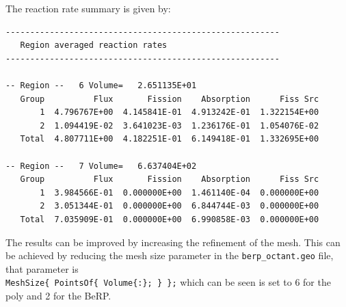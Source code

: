 The reaction rate summary is given by:
\begin{verbatim}
--------------------------------------------------------
   Region averaged reaction rates
--------------------------------------------------------

-- Region --   6 Volume=   2.651135E+01
   Group          Flux       Fission    Absorption      Fiss Src
       1  4.796767E+00  4.145841E-01  4.913242E-01  1.322154E+00
       2  1.094419E-02  3.641023E-03  1.236176E-01  1.054076E-02
   Total  4.807711E+00  4.182251E-01  6.149418E-01  1.332695E+00

-- Region --   7 Volume=   6.637404E+02
   Group          Flux       Fission    Absorption      Fiss Src
       1  3.984566E-01  0.000000E+00  1.461140E-04  0.000000E+00
       2  3.051344E-01  0.000000E+00  6.844744E-03  0.000000E+00
   Total  7.035909E-01  0.000000E+00  6.990858E-03  0.000000E+00
\end{verbatim}

The results can be improved by increasing the refinement of the mesh.
This can be achieved by reducing the mesh size parameter in the \verb"berp_octant.geo" file, that parameter is \\
\verb"MeshSize{ PointsOf{ Volume{:}; } };" which can be seen is set to 6 for the poly and 2 for the BeRP.